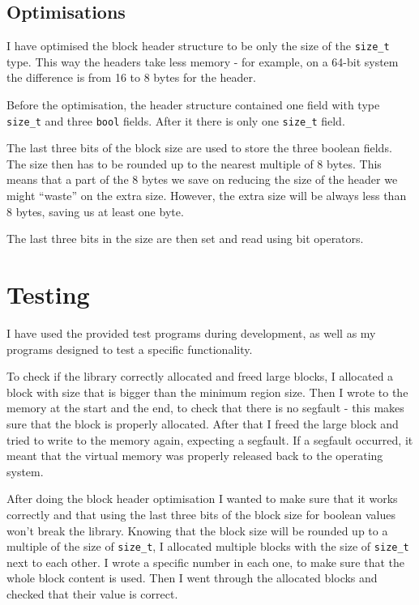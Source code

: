 \documentclass{article}
\begin{document}
\subsection{Optimisations}

I have optimised the block header structure to be only the size of the \lstinline{size_t} type. This way the headers take less memory - for example, on a 64-bit system the difference is from 16 to 8 bytes for the header.

Before the optimisation, the header structure contained one field with type \lstinline{size_t} and three \lstinline{bool} fields. After it there is only one \lstinline{size_t} field.

The last three bits of the block size are used to store the three boolean fields. The size then has to be rounded up to the nearest multiple of 8 bytes. This means that a part of the 8 bytes we save on reducing the size of the header we might ``waste'' on the extra size. However, the extra size will be always less than 8 bytes, saving us at least one byte.

The last three bits in the size are then set and read using bit operators.

\section{Testing}

I have used the provided test programs during development, as well as my programs designed to test a specific functionality.

To check if the library correctly allocated and freed large blocks, I allocated a block with size that is bigger than the minimum region size. Then I wrote to the memory at the start and the end, to check that there is no segfault - this makes sure that the block is properly allocated. After that I freed the large block and tried to write to the memory again, expecting a segfault. If a segfault occurred, it meant that the virtual memory was properly released back to the operating system.

After doing the block header optimisation I wanted to make sure that it works correctly and that using the last three bits of the block size for boolean values won't break the library. Knowing that the block size will be rounded up to a multiple of the size of \lstinline{size_t}, I allocated multiple blocks with the size of \lstinline{size_t} next to each other. I wrote a specific number in each one, to make sure that the whole block content is used. Then I went through the allocated blocks and checked that their value is correct.
\end{document}
